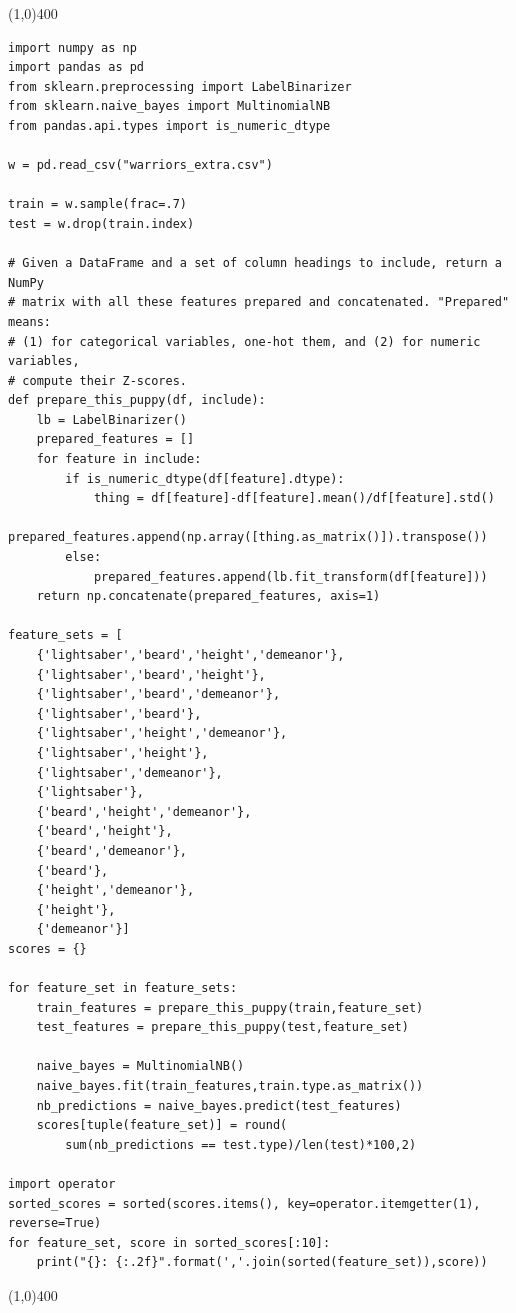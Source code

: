 \documentclass[12pt]{article}
\begin{document}
\pagebreak
\begin{center}
\line(1,0){400}
\end{center}
\scriptsize
\begin{Verbatim}[fontsize=small,samepage=true,frame=none]
import numpy as np
import pandas as pd
from sklearn.preprocessing import LabelBinarizer
from sklearn.naive_bayes import MultinomialNB
from pandas.api.types import is_numeric_dtype

w = pd.read_csv("warriors_extra.csv")

train = w.sample(frac=.7)
test = w.drop(train.index)

# Given a DataFrame and a set of column headings to include, return a NumPy
# matrix with all these features prepared and concatenated. "Prepared" means:
# (1) for categorical variables, one-hot them, and (2) for numeric variables,
# compute their Z-scores.
def prepare_this_puppy(df, include):
    lb = LabelBinarizer()
    prepared_features = []
    for feature in include:
        if is_numeric_dtype(df[feature].dtype):
            thing = df[feature]-df[feature].mean()/df[feature].std()
            prepared_features.append(np.array([thing.as_matrix()]).transpose())
        else:
            prepared_features.append(lb.fit_transform(df[feature]))
    return np.concatenate(prepared_features, axis=1)

feature_sets = [
    {'lightsaber','beard','height','demeanor'},
    {'lightsaber','beard','height'},
    {'lightsaber','beard','demeanor'},
    {'lightsaber','beard'},
    {'lightsaber','height','demeanor'},
    {'lightsaber','height'},
    {'lightsaber','demeanor'},
    {'lightsaber'},
    {'beard','height','demeanor'},
    {'beard','height'},
    {'beard','demeanor'},
    {'beard'},
    {'height','demeanor'},
    {'height'},
    {'demeanor'}]
scores = {}

for feature_set in feature_sets:
    train_features = prepare_this_puppy(train,feature_set)
    test_features = prepare_this_puppy(test,feature_set)

    naive_bayes = MultinomialNB()
    naive_bayes.fit(train_features,train.type.as_matrix())
    nb_predictions = naive_bayes.predict(test_features)
    scores[tuple(feature_set)] = round(
        sum(nb_predictions == test.type)/len(test)*100,2)

import operator
sorted_scores = sorted(scores.items(), key=operator.itemgetter(1), reverse=True)
for feature_set, score in sorted_scores[:10]:
    print("{}: {:.2f}".format(','.join(sorted(feature_set)),score))
\end{Verbatim}
\normalsize
\begin{center}
\line(1,0){400}
\end{center}
\end{document}
